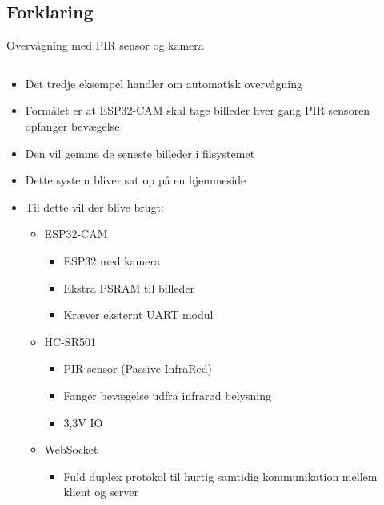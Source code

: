 \documentclass[aspectratio=169]{beamer}
\begin{document}
\subsection{Forklaring}
\begin{frame}{Overvågning med PIR sensor og kamera}
\begin{columns}
	\begin{column}{0.6\textwidth}
		\begin{textBox}
			\begin{itemize}
				\item Det tredje eksempel handler om automatisk overvågning
				\item Formålet er at ESP32-CAM skal tage billeder hver gang PIR sensoren opfanger bevægelse
				\item Den vil gemme de seneste billeder i filsystemet
				\item Dette system bliver sat op på en hjemmeside
				\item Til dette vil der blive brugt:
				\begin{itemize}
					\item ESP32-CAM
					\begin{itemize}
						\item ESP32 med kamera
						\item Ekstra PSRAM til billeder
						\item Kræver eksternt UART modul
					\end{itemize}
					\item HC-SR501
					\begin{itemize}
						\item PIR sensor (Passive InfraRed)
						\item Fanger bevægelse udfra infrarød belysning
						\item 3,3V IO
					\end{itemize}
					\item WebSocket 
					\begin{itemize}
						\item Fuld duplex protokol til hurtig samtidig kommunikation mellem klient og server
					\end{itemize}
				\end{itemize}
			\end{itemize}
		\end{textBox}
	\end{column}
	\begin{column}{0.4\textwidth}
		\centering
		\captionsetup{format=tcbcaptionsmall}
		\begin{columns}

\end{columns}
\end{column}
\end{columns}
\end{frame}
\end{document}
